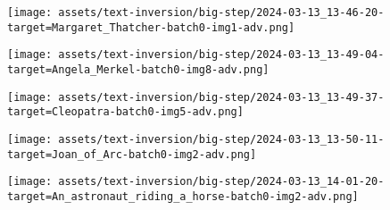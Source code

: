 \begin{figure*}[h]
\vspace{1ex}
\begin{minipage}[t]{.025\textwidth}
     \vspace{0pt}
\end{minipage}%
\hspace{1ex}
\begin{minipage}[t]{0.98\figwidth}
    \vspace{0pt}
    \begin{subfigure}[t]{0.2\textwidth}
        \texttt{[image: assets/text-inversion/big-step/2024-03-13\_13-46-20-target=Margaret\_Thatcher-batch0-img1-adv.png]}
    \end{subfigure}%
    \begin{subfigure}[t]{0.2\textwidth}
        \texttt{[image: assets/text-inversion/big-step/2024-03-13\_13-49-04-target=Angela\_Merkel-batch0-img8-adv.png]}
    \end{subfigure}%
    \begin{subfigure}[t]{0.2\textwidth}
        \texttt{[image: assets/text-inversion/big-step/2024-03-13\_13-49-37-target=Cleopatra-batch0-img5-adv.png]}
    \end{subfigure}%
    \begin{subfigure}[t]{0.2\textwidth}
        \texttt{[image: assets/text-inversion/big-step/2024-03-13\_13-50-11-target=Joan\_of\_Arc-batch0-img2-adv.png]}
    \end{subfigure}%
    \begin{subfigure}[t]{0.2\textwidth}
        \texttt{[image: assets/text-inversion/big-step/2024-03-13\_14-01-20-target=An\_astronaut\_riding\_a\_horse-batch0-img2-adv.png]}
    \end{subfigure}%
\end{minipage}



\end{figure*}
